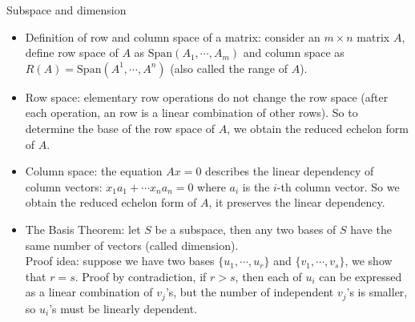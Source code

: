 \documentclass{report}
\begin{document}
Subspace and dimension 
\begin{itemize}
\item Definition of row and column space of a matrix: consider an $m \times n$ matrix $A$, define row space of $A$ as $\text{Span}(A_1, \cdots, A_m)$ and column space as $R(A) = \text{Span}(A^1, \cdots, A^n)$ (also called the range of $A$). 

\item Row space: elementary row operations do not change the row space (after each operation, an row is a linear combination of other rows). So to determine the base of the row space of $A$, we obtain the reduced echelon form of $A$. 
	
\item Column space: the equation $Ax = 0$ describes the linear dependency of column vectors: $x_1 a_1 + \cdots x_n a_n = 0$ where $a_i$ is the $i$-th column vector. So we obtain the reduced echelon form of $A$, it preserves the linear dependency. 

\item The Basis Theorem: let $S$ be a subspace, then any two bases of $S$ have the same number of vectors (called dimension). \\
Proof idea: suppose we have two bases $\{u_1, \cdots, u_r\}$ and $\{v_1, \cdots, v_s\}$, we show that $r = s$. Proof by contradiction, if $r > s$, then each of $u_i$ can be expressed as a linear combination of $v_j$'s, but the number of independent $v_j$'s is smaller, so $u_i$'s must be linearly dependent.  

\end{itemize}
\end{document}
